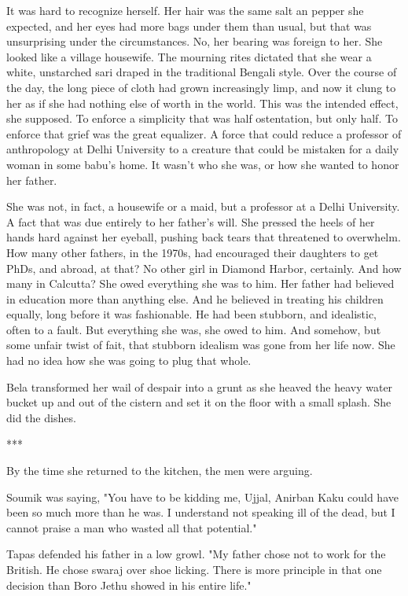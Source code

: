 \documentclass{amsart}
\begin{document}
It was hard to recognize herself. Her hair was the same salt an pepper she expected, and her eyes had more bags under them than usual, but that was unsurprising under the circumstances. No, her bearing was foreign to her. She looked like a village housewife. The mourning rites dictated that she wear a white, unstarched sari draped in the traditional Bengali style. Over the course of the day, the long piece of cloth had grown increasingly limp, and now it clung to her as if she had nothing else of worth in the world. This was the intended effect, she supposed. To enforce a simplicity that was half ostentation, but only half. To enforce that grief was the great equalizer. A force that could reduce a professor of anthropology at Delhi University to a creature that could be mistaken for a daily woman in some babu's home. It wasn't who she was, or how she wanted to honor her father.

She was not, in fact, a housewife or a maid, but a professor at a Delhi University. A fact that was due entirely to her father's will. She pressed the heels of her hands hard against her eyeball, pushing back tears that threatened to overwhelm. How many other fathers, in the 1970s, had encouraged their daughters to get PhDs, and abroad, at that? No other girl in Diamond Harbor, certainly. And how many in Calcutta? She owed everything she was to him. Her father had believed in education more than anything else. And he believed in treating his children equally, long before it was fashionable. He had been stubborn, and idealistic, often to a fault. But everything she was, she owed to him. And somehow, but some unfair twist of fait, that stubborn idealism was gone from her life now. She had no idea how she was going to plug that whole.

Bela transformed her wail of despair into a grunt as she heaved the heavy water bucket up and out of the cistern and set it on the floor with a small splash. She did the dishes.

\begin{center} *** \end{center}

By the time she returned to the kitchen, the men were arguing. 

Soumik was saying, "You have to be kidding me, Ujjal, Anirban Kaku could have been so much more than he was. I understand not speaking ill of the dead, but I cannot praise a man who wasted all that potential."

Tapas defended his father in a low growl. "My father chose not to work for the British. He chose swaraj over shoe licking. There is more principle in that one decision than Boro Jethu showed in his entire life." 
\end{document}
